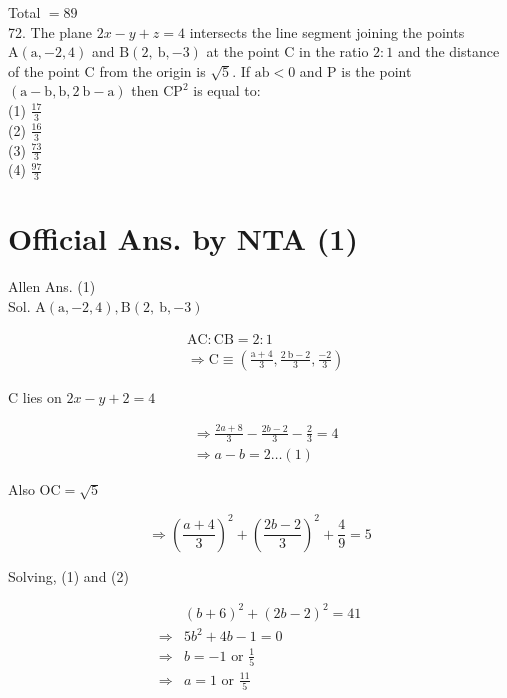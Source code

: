 \documentclass[10pt]{article}
\begin{document}
Total \(=89\)\\
72. The plane \(2 x-y+z=4\) intersects the line segment joining the points \(\mathrm{A}(\mathrm{a},-2,4)\) and \(\mathrm{B}(2, \mathrm{~b},-3)\) at the point C in the ratio \(2: 1\) and the distance of the point C from the origin is \(\sqrt{5}\). If \(\mathrm{ab}<0\) and P is the point \((\mathrm{a}-\mathrm{b}, \mathrm{b}, 2 \mathrm{~b}-\mathrm{a})\) then \(\mathrm{CP}^{2}\) is equal to:\\
(1) \(\frac{17}{3}\)\\
(2) \(\frac{16}{3}\)\\
(3) \(\frac{73}{3}\)\\
(4) \(\frac{97}{3}\)

\section*{Official Ans. by NTA (1)}
Allen Ans. (1)\\
Sol. \(\mathrm{A}(\mathrm{a},-2,4), \mathrm{B}(2, \mathrm{~b},-3)\)

\[
\begin{aligned}
& \mathrm{AC}: \mathrm{CB}=2: 1 \\
& \Rightarrow \mathrm{C} \equiv\left(\frac{\mathrm{a}+4}{3}, \frac{2 \mathrm{~b}-2}{3}, \frac{-2}{3}\right)
\end{aligned}
\]

C lies on \(2 x-y+2=4\)

\[
\begin{aligned}
& \Rightarrow \frac{2 a+8}{3}-\frac{2 b-2}{3}-\frac{2}{3}=4 \\
& \Rightarrow a-b=2 \ldots(1)
\end{aligned}
\]

Also \(\mathrm{OC}=\sqrt{5}\)

\[
\Rightarrow\left(\frac{a+4}{3}\right)^{2}+\left(\frac{2 b-2}{3}\right)^{2}+\frac{4}{9}=5
\]

Solving, (1) and (2)

\[
\begin{aligned}
& (b+6)^{2}+(2 b-2)^{2}=41 \\
\Rightarrow & 5 b^{2}+4 b-1=0 \\
\Rightarrow & b=-1 \text { or } \frac{1}{5} \\
\Rightarrow & a=1 \text { or } \frac{11}{5}
\end{aligned}
\]
\end{document}
